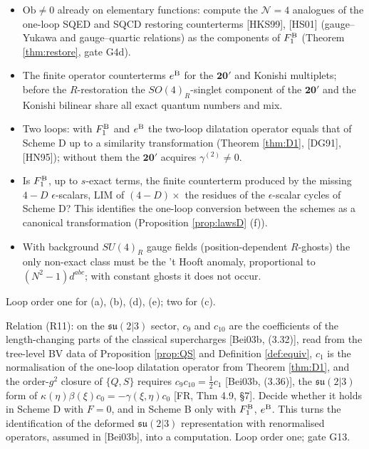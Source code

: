 \begin{problem}
\label{q:Q2}
\begin{itemize}
\item[(a)] $\mathrm{Ob}\neq0$ already on elementary functions: compute the $\mathcal N=4$ analogues of the one-loop SQED and SQCD restoring counterterms [HKS99], [HS01] (gauge--Yukawa and gauge--quartic relations) as the components of $F_1^{\rm B}$ (Theorem \ref{thm:restore}, gate G4d).
\item[(b)] The finite operator counterterms $e^{\rm B}$ for the $\mathbf{20}'$ and Konishi multiplets; before the $R$-restoration the $SO(4)_R$-singlet component of the $\mathbf{20}'$ and the Konishi bilinear share all exact quantum numbers and mix.
\item[(c)] Two loops: with $F_1^{\rm B}$ and $e^{\rm B}$ the two-loop dilatation operator equals that of Scheme D up to a similarity transformation (Theorem \ref{thm:D1}, [DG91], [HN95]); without them the $\mathbf{20}'$ acquires $\gamma^{(2)}\neq0$.
\item[(d)] Is $F_1^{\rm B}$, up to $s$-exact terms, the finite counterterm produced by the missing $4-D$ $\epsilon$-scalars, $\mathrm{LIM}$ of $(4-D)\times$ the residues of the $\epsilon$-scalar cycles of Scheme D? This identifies the one-loop conversion between the schemes as a canonical transformation (Proposition \ref{prop:lawsD} (f)).
\item[(e)] With background $SU(4)_R$ gauge fields (position-dependent $R$-ghosts) the only non-exact class must be the 't Hooft anomaly, proportional to $(N^2-1)d^{abc}$; with constant ghosts it does not occur.
\end{itemize}
Loop order one for (a), (b), (d), (e); two for (c).
\end{problem}

\begin{problem}
\label{q:Q3}
Relation (R11): on the $\mathfrak{su}(2|3)$ sector, $c_9$ and $c_{10}$ are the coefficients of the length-changing parts of the classical supercharges [Bei03b, (3.32)], read from the tree-level BV data of Proposition \ref{prop:QS} and Definition \ref{def:equiv}, $c_1$ is the normalisation of the one-loop dilatation operator from Theorem \ref{thm:D1}, and the order-$g^2$ closure of $\{Q,S\}$ requires $c_9c_{10}=\frac12c_1$ [Bei03b, (3.36)], the $\mathfrak{su}(2|3)$ form of $\kappa(\eta)\beta(\xi)c_0=-\gamma(\xi,\eta)c_0$ [FR, Thm 4.9, §7]. Decide whether it holds in Scheme D with $F=0$, and in Scheme B only with $F_1^{\rm B}$, $e^{\rm B}$. This turns the identification of the deformed $\mathfrak{su}(2|3)$ representation with renormalised operators, assumed in [Bei03b], into a computation. Loop order one; gate G13.
\end{problem}


